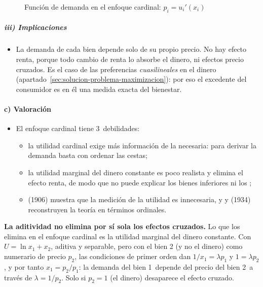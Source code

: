 \documentclass[11pt]{article}
\begin{document}
\begin{figure}[H]
\centering
\caption{Función de demanda en el enfoque cardinal: $p_i=u_i'(x_i)$}\label{fig:demanda-cardinal}
\end{figure}

\subparagraph{iii) Implicaciones}

\begin{itemize}
\item La demanda de cada bien depende solo de su propio precio. No hay efecto renta, porque todo cambio de renta lo absorbe el dinero, ni efectos precio cruzados. Es el caso de las preferencias \emph{cuasilineales} en el dinero (apartado~\ref{sec:solucion-problema-maximizacion}): por eso el excedente del consumidor es en él una medida exacta del bienestar.
\end{itemize}

\paragraph{c) Valoración}

\begin{itemize}
\item El enfoque cardinal tiene 3~debilidades:
\begin{itemize}
\item la utilidad cardinal exige más información de la necesaria: para derivar la demanda basta con ordenar las cestas;
\item la utilidad marginal del dinero constante es poco realista y elimina el efecto renta, de modo que no puede explicar los bienes inferiores ni los ;
\item {} (1906) muestra que la medición de la utilidad es innecesaria, y  y  (1934) reconstruyen la teoría en términos ordinales.
\end{itemize}
\end{itemize}

\begin{anotaciones}
\textbf{La aditividad no elimina por sí sola los efectos cruzados.} Lo que los elimina en el enfoque cardinal es la utilidad marginal del dinero constante. Con $U=\ln x_1+x_2$, aditiva y separable, pero con el bien 2 (y no el dinero) como numerario de precio $p_2$, las condiciones de primer orden dan $1/x_1=\lambda p_1$ y $1=\lambda p_2$, y por tanto $x_1=p_2/p_1$: la demanda del bien 1~depende del precio del bien 2~a través de $\lambda=1/p_2$. Solo si $p_2=1$ (el dinero) desaparece el efecto cruzado.
\end{anotaciones}
\end{document}
